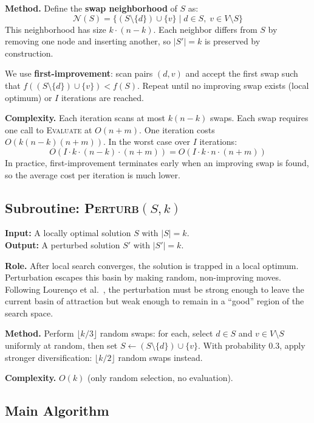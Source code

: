 \documentclass[11pt,a4paper]{article}
\begin{document}
\textbf{Method.} Define the \textbf{swap neighborhood} of $S$ as:
\[
\mathcal{N}(S) = \{(S \setminus \{d\}) \cup \{v\} \mid d \in S,\; v \in V \setminus S\}
\]
This neighborhood has size $k \cdot (n - k)$. Each neighbor differs from $S$ by removing one node and inserting another, so $|S'| = k$ is preserved by construction.

We use \textbf{first-improvement}: scan pairs $(d, v)$ and accept the first swap such that $f((S \setminus \{d\}) \cup \{v\}) < f(S)$. Repeat until no improving swap exists (local optimum) or $I$ iterations are reached.

\textbf{Complexity.} Each iteration scans at most $k(n-k)$ swaps. Each swap requires one call to \textsc{Evaluate} at $O(n+m)$. One iteration costs $O(k(n-k)(n+m))$. In the worst case over $I$ iterations:
\[
O(I \cdot k \cdot (n - k) \cdot (n + m)) = O(I \cdot k \cdot n \cdot (n + m))
\]
In practice, first-improvement terminates early when an improving swap is found, so the average cost per iteration is much lower.

\subsection{Subroutine: \textsc{Perturb}$(S, k)$}

\textbf{Input:} A locally optimal solution $S$ with $|S| = k$.\\
\textbf{Output:} A perturbed solution $S'$ with $|S'| = k$.

\textbf{Role.} After local search converges, the solution is trapped in a local optimum. Perturbation escapes this basin by making random, non-improving moves. Following Louren\c{c}o et al.~\cite{lourenco2003}, the perturbation must be strong enough to leave the current basin of attraction but weak enough to remain in a ``good'' region of the search space.

\textbf{Method.} Perform $\lfloor k/3 \rfloor$ random swaps: for each, select $d \in S$ and $v \in V \setminus S$ uniformly at random, then set $S \gets (S \setminus \{d\}) \cup \{v\}$. With probability 0.3, apply stronger diversification: $\lfloor k/2 \rfloor$ random swaps instead.

\textbf{Complexity.} $O(k)$ (only random selection, no evaluation).

\subsection{Main Algorithm}
\end{document}
